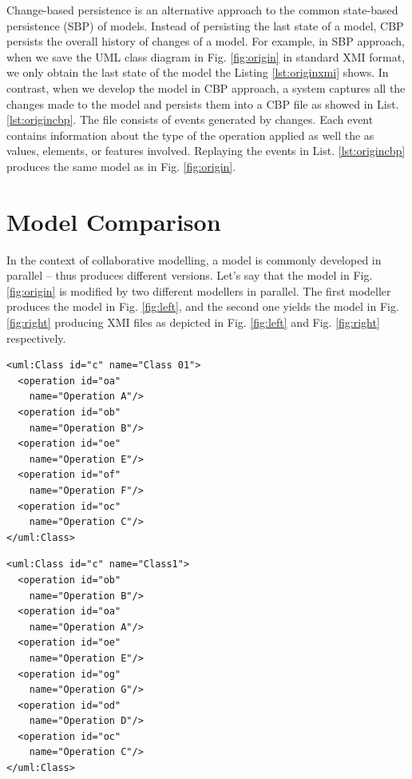 \documentclass{llncs}
\begin{document}
Change-based persistence is an alternative approach to the common state-based persistence (SBP) of models. Instead of persisting the last state of a model, CBP persists the overall history of changes of a model. For example, in SBP approach, when we save the UML class diagram in Fig. \ref{fig:origin} in standard XMI format, we only obtain the last state of the model the Listing \ref{lst:originxmi} shows. In contrast, when we develop the model in CBP approach, a system captures all the changes made to the model and persists them into a CBP file as showed in List. \ref{lst:origincbp}. The file consists of events generated by changes. Each event contains information about the type of the operation applied as well the as values, elements, or features involved. Replaying the events in List. \ref{lst:origincbp} produces the same model as in Fig. \ref{fig:origin}.

\section{Model Comparison}
\label{sec:model_comparison}
In the context of collaborative modelling, a model is commonly developed in parallel -- thus produces different versions. Let's say that the model in Fig. \ref{fig:origin} is modified by two different modellers in parallel. The first modeller produces the model in Fig. \ref{fig:left}, and the second one yields the model in Fig. \ref{fig:right} producing XMI files as depicted in Fig. \ref{fig:left} and Fig. \ref{fig:right} respectively.

\begin{minipage}[t]{0.49\linewidth} 
\begin{lstlisting}[style=eol,caption={The simplified XMI of the model in Fig. \ref{fig:left}.},label=lst:leftxmi]
<uml:Class id="c" name="Class 01">
  <operation id="oa" 
    name="Operation A"/>
  <operation id="ob" 
    name="Operation B"/>
  <operation id="oe" 
    name="Operation E"/>
  <operation id="of" 
    name="Operation F"/>
  <operation id="oc" 
    name="Operation C"/>
</uml:Class>
\end{lstlisting}
\end{minipage}
\hfill
\begin{minipage}[t]{0.49\linewidth}
\begin{lstlisting}[style=eol,caption={The simplified XMI of the model in Fig. \ref{fig:right}.},label=lst:rightxmi]
<uml:Class id="c" name="Class1">
  <operation id="ob" 
    name="Operation B"/>
  <operation id="oa" 
    name="Operation A"/>
  <operation id="oe" 
    name="Operation E"/>
  <operation id="og" 
    name="Operation G"/>
  <operation id="od" 
    name="Operation D"/>
  <operation id="oc" 
    name="Operation C"/>
</uml:Class>
\end{lstlisting}
\end{minipage}
\end{document}

